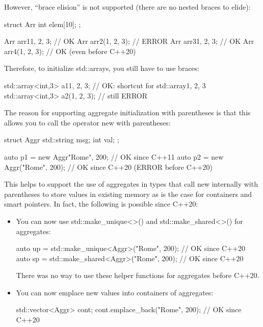 However, “brace elision” is not supported (there are no nested braces to elide):

\begin{cpp}
struct Arr {
	int elem[10];
};

Arr arr1{1, 2, 3}; // OK
Arr arr2(1, 2, 3); // ERROR
Arr arr3{{1, 2, 3}}; // OK
Arr arr4({1, 2, 3}); // OK (even before C++20)
\end{cpp}

Therefore, to initialize std::arrays, you still have to use braces:

\begin{cpp}
std::array<int,3> a1{1, 2, 3}; // OK: shortcut for std::array{{1, 2, 3}}
std::array<int,3> a2(1, 2, 3); // still ERROR
\end{cpp}


The reason for supporting aggregate initialization with parentheses is that this allows you to call the operator new with parentheses:

\begin{cpp}
struct Aggr {
	std::string msg;
	int val;
};

auto p1 = new Aggr{"Rome", 200}; // OK since C++11
auto p2 = new Aggr("Rome", 200); // OK since C++20 (ERROR before C++20)
\end{cpp}

This helps to support the use of aggregates in types that call new internally with parentheses to store values in existing memory as is the case for containers and smart pointers. In fact, the following is possible since C++20:

\begin{itemize}
\item 
You can now use std::make\_unique<>() and std::make\_shared<>() for aggregates:

\begin{cpp}
auto up = std::make_unique<Aggr>("Rome", 200); // OK since C++20
auto sp = std::make_shared<Aggr>("Rome", 200); // OK since C++20
\end{cpp}

There was no way to use these helper functions for aggregates before C++20.

\item 
You can now emplace new values into containers of aggregates:

\begin{cpp}
std::vector<Aggr> cont;
cont.emplace_back("Rome", 200); // OK since C++20
\end{cpp}
\end{itemize}

